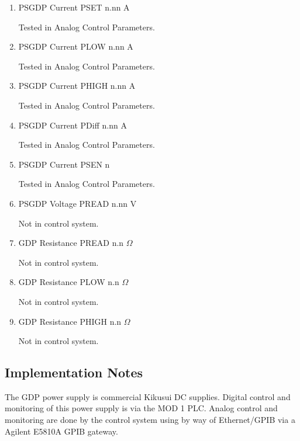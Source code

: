 \documentclass[11pt]{book}		%
\begin{document}
\begin{enumerate}
 \item PSGDP Current PSET  n.nn A

\color{red}
Tested in Analog Control Parameters.
\color{black}

 \item PSGDP Current PLOW  n.nn A

\color{red}
Tested in Analog Control Parameters.
\color{black}

 \item PSGDP Current PHIGH n.nn A

\color{red}
Tested in Analog Control Parameters.
\color{black}

 \item PSGDP Current PDiff n.nn A

\color{red}
Tested in Analog Control Parameters.
\color{black}

 \item PSGDP Current PSEN  n

\color{red}
Tested in Analog Control Parameters.
\color{black}

 \item PSGDP Voltage PREAD n.nn V

\color{red}
Not in control system.
\color{black}

 \item GDP Resistance PREAD n.n $\Omega$

\color{red}
Not in control system.
\color{black}

 \item GDP Resistance PLOW n.n $\Omega$

\color{red}
Not in control system.
\color{black}

 \item GDP Resistance PHIGH n.n $\Omega$

\color{red}
Not in control system.
\color{black}

\end{enumerate}

\subsection{Implementation Notes}

The GDP power supply is commercial Kikusui DC supplies.  Digital control and monitoring of this power supply is via the MOD 1 PLC.  Analog control and monitoring are done by the control system using by way of Ethernet/GPIB via a Agilent E5810A GPIB gateway.
\end{document}
